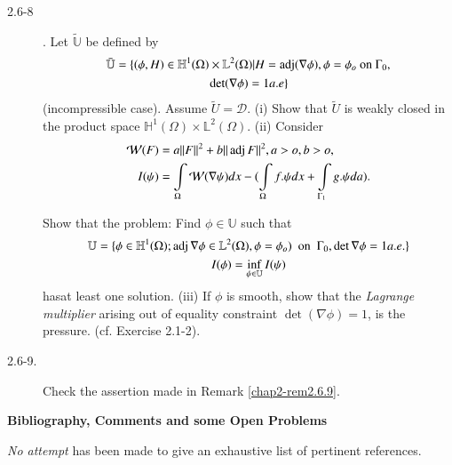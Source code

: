 \begin{description}
\item[2.6-8]. Let $\tilde{\mathbb{U}}$ be defined by
  \begin{multline*}
  \bar {\mathbb{U}}= \{(\phi ,H) \in \mathbb{H}^1 (\Omega) \times
  \mathbb{L}^2 (\Omega)|H=\operatorname{adj} (\nabla \phi), \phi=\phi_o
  ~\text{on}~ \Gamma_0,\\ 
  \left.\det (\nabla \phi)=1 a. e \right\} 
  \end{multline*}
  (incompressible case). Assume 
  $\tilde{U}= \mathscr{D}$. (i) Show that 
  $\tilde{U}$ is weakly closed in the product space $\mathbb{H}^1
  (\Omega) \times \mathbb{L}^2 (\Omega)$. (ii) Consider 
  \begin{align*}
    \mathcal{W}(F)&= a \| F \|^2 + b \| \operatorname{adj} F \|^2, a>o,b>o,\\
    I(\psi)&= \int \limits _\Omega \mathcal{W}(\nabla \psi)dx-
    (\int \limits _ \Omega f. \psi dx + \int \limits _{\Gamma_1}
    g. \psi da).  
  \end{align*}

  Show that the problem: Find $\phi \in \mathbb{U}$ such that 
{\fontsize{10pt}{12pt}\selectfont
  \begin{multline*}
  \mathbb{U}=\{\phi \in \mathbb{H}^1 (\Omega); \operatorname{adj}  \nabla \phi \in
  \mathbb{L}^2(\Omega), \phi =\phi_o) ~\text{~on~}~ \Gamma_0, \det
  \nabla \phi =1 a . e. \}\\ 
  I(\phi)= \inf_ {\psi \in \mathbb{U}}I (\psi)  
  \end{multline*}\relax}\relax
  has\pageoriginale at least one solution. (iii) If $\phi$ is smooth,
  show that the 
  \textit{Lagrange multiplier} arising out of equality constraint $\det
  (\nabla \phi)=1$, is the pressure. (cf. Exercise 2.1-2).  

\item[2.6-9.] Check the assertion made in Remark \ref{chap2-rem2.6.9}. 
\end{description}

\newpage

\bigskip
\begin{center}
{\large\bf Bibliography, Comments and some Open Problems}\pageoriginale
\end{center}


{\em No attempt} has been made to give an exhaustive list of pertinent
references.  

